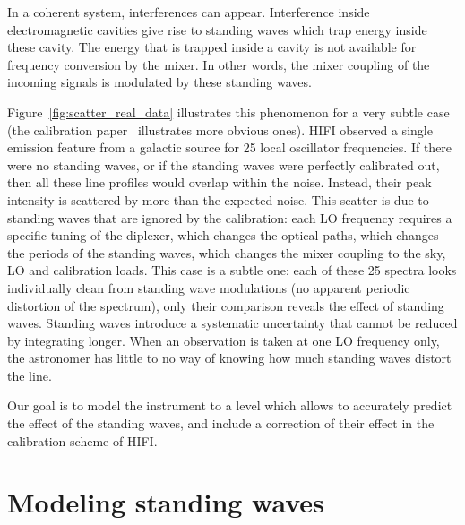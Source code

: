 \documentclass[journal]{IEEEtran}
\begin{document}
In a coherent system, interferences can appear.
Interference inside electromagnetic cavities give rise to standing waves which trap energy inside these cavity.
The energy that is trapped inside a cavity is not available for frequency conversion by the mixer.
In other words, the mixer coupling of the incoming signals is modulated by these standing waves.

Figure~\ref{fig:scatter_real_data} illustrates this phenomenon for a very subtle case
(the calibration paper~\cite{AA_537_A17} illustrates more obvious ones).
HIFI observed a single emission feature from a galactic source for 25 local oscillator frequencies.
If there were no standing waves, or if the standing waves were perfectly calibrated out, then all these line profiles would overlap within the noise.
Instead, their peak intensity is scattered by more than the expected noise.
This scatter is due to standing waves that are ignored by the calibration: each LO frequency requires a specific tuning of the diplexer, which changes the optical paths, which changes the periods of the standing waves, which changes the mixer coupling to the sky, LO and calibration loads.
This case is a subtle one: each of these 25 spectra looks individually clean from standing wave modulations (no apparent periodic distortion of the spectrum), only their comparison reveals the effect of standing waves.
Standing waves introduce a systematic uncertainty that cannot be reduced by integrating longer.
When an observation is taken at one LO frequency only, the astronomer has little to no way of knowing how much standing waves distort the line.

Our goal is to model the instrument to a level which allows to accurately predict the effect of the standing waves, and include a correction of their effect in the calibration scheme of HIFI.


\section{Modeling standing waves}
\end{document}
